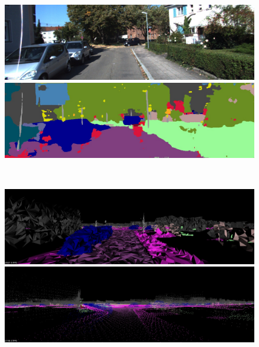 \begin{figure}[htbp]
 \begin{minipage}[b]{0.50\hsize}
 \begin{center}
  \includegraphics[keepaspectratio, scale=0.18]{./picture/bgrimage/bgrimage11.jpg}
  \end{center}
 \end{minipage}
 \begin{minipage}[b]{0.5\hsize}
 \begin{center}
  \includegraphics[keepaspectratio, scale=0.18]{./picture/segimage/image11.jpg}
  \end{center}
 \end{minipage} \\
 \begin{minipage}[b]{0.50\hsize}
 \begin{center}
  \includegraphics[keepaspectratio, scale=0.18]{./picture/mesh_map_image/image11.jpg}
  \end{center}
 \end{minipage}
 \begin{minipage}[b]{0.50\hsize}
 \begin{center}
  \includegraphics[keepaspectratio, scale=0.18]{./picture/point_map_image/image11.jpg}

\end{center}
\end{minipage}
\end{figure}
